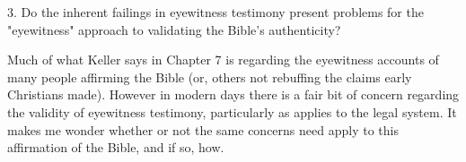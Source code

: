 \documentclass[12pt]{turabian-researchpaper}
\begin{document}
3. Do the inherent failings in eyewitness testimony present problems for the "eyewitness" approach to validating the Bible's authenticity?

Much of what Keller says in Chapter 7 is regarding the eyewitness accounts of many people affirming the Bible (or, others not rebuffing the claims early Christians made). However in modern days there is a fair bit of concern regarding the validity of eyewitness testimony, particularly as applies to the legal system. It makes me wonder whether or not the same concerns need apply to this affirmation of the Bible, and if so, how.

\newpage
\printbibliography
\end{document}
